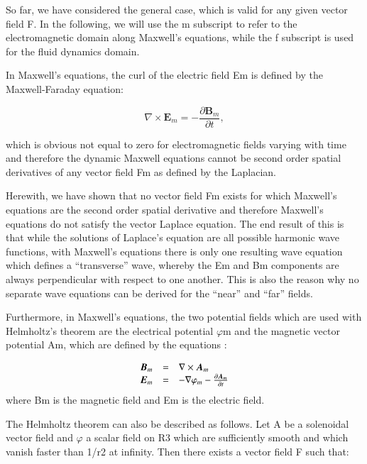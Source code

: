 \documentclass[twoside,final]{article}
\begin{document}
{So far, we have considered the general case, which is valid for any given vector
field F. In the following, we will use the m subscript to refer to the
electromagnetic domain along Maxwell's equations, while the f subscript is used
for the fluid dynamics domain. 

In Maxwell's equations, the curl of the electric field Em is defined by the
Maxwell-Faraday equation:

\begin{equation}
\nabla \times \boldsymbol E_m=-\frac{\partial \boldsymbol B_m}{\partial t},
\end{equation}

which is obvious not equal to zero for electromagnetic fields varying with time
and therefore the dynamic Maxwell equations cannot be second order spatial
derivatives of any vector field Fm as defined by the Laplacian. 

Herewith, we have shown that no vector field Fm exists for which Maxwell's
equations are the second order spatial derivative and therefore Maxwell's
equations do not satisfy the vector Laplace equation. The end result of this is
that while the solutions of Laplace's equation are all possible harmonic wave
functions, with Maxwell's equations there is only one resulting wave equation
which defines a ``transverse'' wave, whereby the Em and Bm components are always
perpendicular with respect to one another. This is also the reason why no
separate wave equations can be derived for the ``near'' and ``far'' fields.

Furthermore, in Maxwell's equations, the two potential fields which are used
with Helmholtz's theorem are the electrical potential $\varphi $m and the
magnetic vector potential Am, which are defined by the equations
\cite{Feynman1964}:


\begin{equation}
\begin{matrix}\hfill \boldsymbol B_m&=&\nabla \times \boldsymbol A_m\hfill\null \\\hfill \boldsymbol
E_m&=&-\nabla \varphi _m-\frac{\partial \boldsymbol A_m}{\partial t}\hfill\null \end{matrix}
\end{equation}
where Bm is the magnetic field and Em is the electric field.

The Helmholtz theorem can also be described as follows. Let A be a solenoidal
vector field and $\varphi $ a scalar field on R3 which are sufficiently smooth
and which vanish faster than 1/r2 at infinity. Then there exists a vector field
F such that:

}
\end{document}
